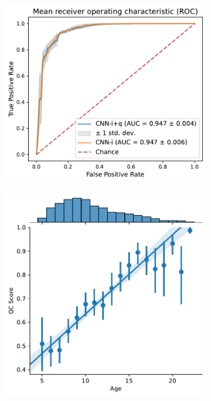\documentclass[fleqn,10pt]{wlscirep}
\begin{document}
\begin{figure}[htbp]
    \begin{subfigure}{.25\textwidth}
    \centering
    \includegraphics[width=\linewidth]{deep-learning-qc/dl_roc_auc_curve.pdf}
    \caption{}
    \label{fig:dl-qc:roc}
    \end{subfigure}
    \begin{subfigure}{.25\textwidth}
    \centering
    \includegraphics[width=\linewidth]{bundle-profiles/qc-age-jointplot.pdf}

\end{subfigure}
\end{figure}
\end{document}
